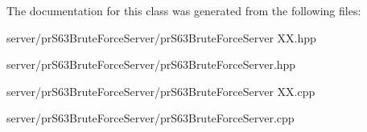 The documentation for this class was generated from the following files\+:\begin{DoxyCompactItemize}
\item 
server/pr\+S63\+Brute\+Force\+Server/pr\+S63\+Brute\+Force\+Server X\+X.\+hpp\item 
server/pr\+S63\+Brute\+Force\+Server/pr\+S63\+Brute\+Force\+Server.\+hpp\item 
server/pr\+S63\+Brute\+Force\+Server/pr\+S63\+Brute\+Force\+Server X\+X.\+cpp\item 
server/pr\+S63\+Brute\+Force\+Server/pr\+S63\+Brute\+Force\+Server.\+cpp\end{DoxyCompactItemize}
